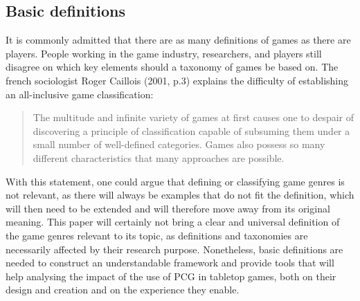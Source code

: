 \subsection{Basic definitions}
It is commonly admitted that there are as many definitions of games as there are players. People working in the game industry, researchers, and players still disagree on which key elements should a taxonomy of games be based on. The french sociologist Roger Caillois (2001, p.3)\cite{book:mpg} explains the difficulty of establishing an all-inclusive game classification:
\begin{quotation}
The multitude and infinite variety of games at first causes one to despair of discovering a principle of classification capable of subsuming them under a small number of well-defined categories. Games also possess so many different characteristics that many approaches are possible.
\end{quotation} 
With this statement, one could argue that defining or classifying game genres is not relevant, as there will always be examples that do not fit the definition, which will then need to be extended and will therefore move away from its original meaning. This paper will certainly not bring a clear and universal definition of the game genres relevant to its topic, as definitions and taxonomies are necessarily affected by their research purpose. Nonetheless, basic definitions are needed to construct an understandable framework and provide tools that will help analysing the impact of the use of PCG in tabletop games, both on their design and creation and on the experience they enable.
